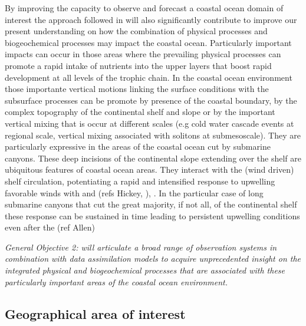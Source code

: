 By improving the capacity to observe and forecast a coastal ocean domain
of interest the approach followed in \proj will also significantly
contribute to improve our present understanding on how the combination
of physical processes and biogeochemical processes may impact the
coastal ocean. Particularly important impacts can occur in those areas
where the prevailing physical processes can promote a rapid intake of
nutrients into the upper layers that boost rapid development at all
levels of the trophic chain. In the coastal ocean environment those
importante vertical motions linking the surface conditions with the
subsurface processes can be promote by presence of the coastal boundary,
by the complex topography of the continental shelf and slope or by the
important vertical mixing that is occur at different scales (e.g cold
water cascade events at regional scale, vertical mixing associated with
solitons at submesoscale). They are particularly expressive in the areas
of the coastal ocean cut by submarine canyons. These deep incisions of
the continental slope extending over the shelf are ubiquitous features
of coastal ocean areas. They interact with the (wind driven) shelf
circulation, potentiating a rapid and intensified response to upwelling
favorable winds with and (refs Hickey, ), . In the particular case of
long submarine canyons that cut the great majority, if not all, of the
continental shelf these response can be sustained in time leading to
persistent upwelling conditions even after the (ref Allen)
 
\emph{General Objective 2: \proj will articulate a broad range of
  observation systems in combination with data assimilation models to
  acquire unprecedented insight on the integrated physical and
  biogeochemical processes that are associated with these particularly
  important areas of the coastal ocean environment.}

\subsection{Geographical area of interest}

